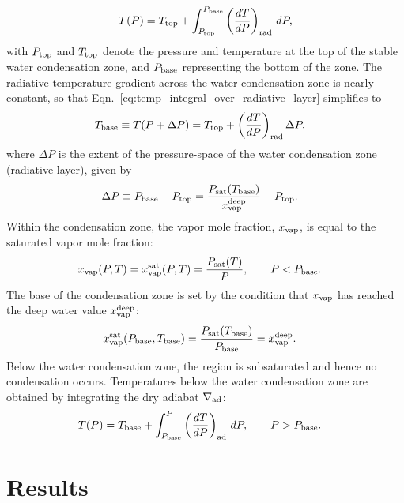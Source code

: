 \documentclass[11pt]{ucscthesisbs}
\begin{document}
\begin{equation}
  T(P) = T_{\rm top} + \int_{P_{\rm top}}^{P_{\rm base}} \left(\frac{dT}{dP}\right)_{\rm rad}\,d P ,
  \label{eq:temp_integral_over_radiative_layer}
\end{equation}
with $P_{\rm top}$ and $T_{\rm top}$ denote the pressure and temperature at the top of the stable water condensation zone, and $P_{\rm base}$ representing the bottom of the zone. The radiative temperature gradient across the water condensation zone is nearly constant, so that Eqn.~\ref{eq:temp_integral_over_radiative_layer} simplifies to
\begin{align}
T_{\rm base}\equiv T(P+\Delta P) &= T_{\rm top} + \left(\frac{dT}{dP}\right)_{\rm rad}\Delta P ,
\label{eq:temperature_profile_over_radiative_layer_simplification}
\end{align}
where $\Delta P$ is the extent of the pressure-space of the water condensation zone (radiative layer), given by
\begin{align}
\Delta P \equiv P_{\rm base}-P_{\rm top} &= \frac{P_{\rm sat}(T_{\rm base})}{x_{\rm vap}^{\rm deep}} - P_{\rm top}.
\label{eq:delta_P_over_radiative_layer}
\end{align}
Within the condensation zone, the vapor mole fraction, $x_{\rm vap}$, is equal to the saturated vapor mole fraction:
\begin{align}
x_{\rm vap}(P, T) &= x_{\rm vap}^{\rm sat}(P, T) = \frac{P_{\rm sat}(T)}{P}, \qquad P<P_{\rm base}.
\label{eq:vapor_mole_fraction_within_condensation_zone}
\end{align}
The base of the condensation zone is set by the condition that $x_{\rm vap}$ has reached the deep water value $x_{\rm vap}^{\rm deep}$:
\begin{align}
x_{\rm vap}^{\rm sat}(P_{\rm base}, T_{\rm base}) &= \frac{P_{\rm sat}(T_{\rm base})}{P_{\rm base}}=x_{\rm vap}^{\rm deep}.
\label{eq:cloud_base}
\end{align}
Below the water condensation zone, the region is subsaturated and hence no condensation occurs. Temperatures below the water condensation zone are obtained by integrating the dry adiabat $\nabla_{\rm ad}$:
\begin{align}
T(P) &= T_{\rm base} + \int_{P_{\rm base}}^P\left(\frac{dT}{dP}\right)_{\rm ad}\,d P, \qquad  P>P_{\rm base} .
\label{eq:dry_adiabat_integration}
\end{align}


\chapter{Results}
\end{document}
